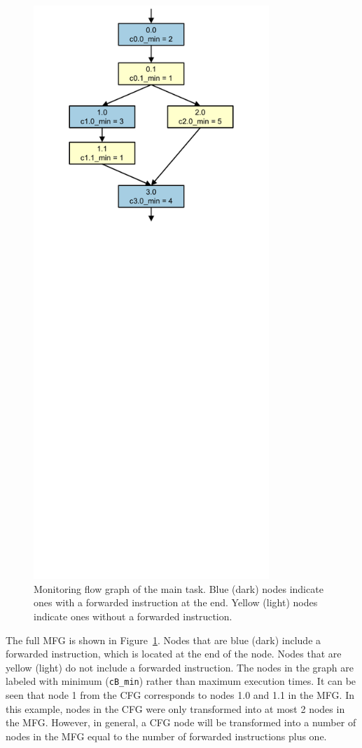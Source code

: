\begin{figure}
  \begin{center}
    \includegraphics[width=3.5in]{monitoring_wcet/figs/mfg.pdf}
    \caption{Monitoring flow graph of the main task. Blue (dark) nodes indicate ones with a forwarded instruction at the end. Yellow (light) nodes indicate ones without a forwarded instruction.}
    \label{fig:monitoring_wcet.example.mfg}
  \end{center}
\end{figure}

The full MFG is shown in
Figure~\ref{fig:monitoring_wcet.example.mfg}. Nodes that are blue (dark) include a forwarded
instruction, which is located at the end of the node. Nodes that are yellow
(light) do not include a forwarded instruction. The nodes in the graph are
labeled with minimum ({\tt cB\_min}) rather than maximum execution times. It can be seen that
node 1 from the CFG corresponds to nodes 1.0 and 1.1 in the MFG. In this example,
nodes in the CFG were only transformed into at most 2 nodes in the MFG.
However, in general, a CFG node will be transformed into a number of nodes in
the MFG equal to the number of forwarded instructions plus one.

